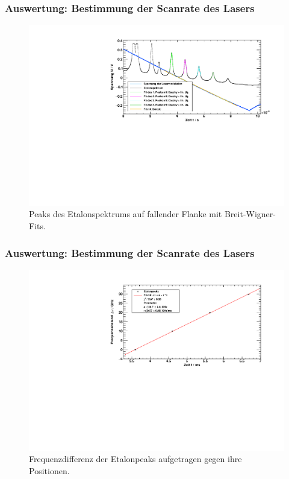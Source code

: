 \begin{frame}
\frametitle{Auswertung: Bestimmung der Scanrate des Lasers}
\begin{figure}
    \centering
    \includegraphics[width=\textwidth]{../img/down-etalon_zoom_fit.pdf}
    \caption{Peaks des Etalonspektrums auf fallender Flanke mit Breit-Wigner-Fits.}
\end{figure}
\end{frame}

\begin{frame}
\frametitle{Auswertung: Bestimmung der Scanrate des Lasers}
  \begin{figure}[H]
      \centering
      \includegraphics[width=\textwidth]{../img/down-etalon_zoom-etalon_calibration.pdf}
      \caption{Frequenzdifferenz der Etalonpeaks aufgetragen gegen ihre Positionen.}
  \end{figure}
\end{frame}

